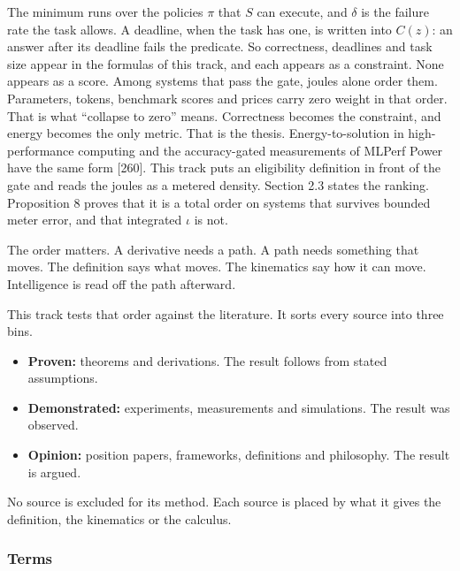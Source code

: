 \documentclass[
  10pt,
]{article}
\providecommand{\tightlist}{%
  \setlength{\itemsep}{0pt}\setlength{\parskip}{0pt}}
\begin{document}
The minimum runs over the policies \(\pi\) that \(S\) can execute, and
\(\delta\) is the failure rate the task allows. A deadline, when the
task has one, is written into \(C(z)\): an answer after its deadline
fails the predicate. So correctness, deadlines and task size appear in
the formulas of this track, and each appears as a constraint. None
appears as a score. Among systems that pass the gate, joules alone order
them. Parameters, tokens, benchmark scores and prices carry zero weight
in that order. That is what ``collapse to zero'' means. Correctness
becomes the constraint, and energy becomes the only metric. That is the
thesis. Energy-to-solution in high-performance computing and the
accuracy-gated measurements of MLPerf Power have the same form
{[}260{]}. This track puts an eligibility definition in front of the
gate and reads the joules as a metered density. Section 2.3 states the
ranking. Proposition 8 proves that it is a total order on systems that
survives bounded meter error, and that integrated \(\iota\) is not.

The order matters. A derivative needs a path. A path needs something
that moves. The definition says what moves. The kinematics say how it
can move. Intelligence is read off the path afterward.

This track tests that order against the literature. It sorts every
source into three bins.

\begin{itemize}
\tightlist
\item
  \textbf{Proven:} theorems and derivations. The result follows from
  stated assumptions.
\item
  \textbf{Demonstrated:} experiments, measurements and simulations. The
  result was observed.
\item
  \textbf{Opinion:} position papers, frameworks, definitions and
  philosophy. The result is argued.
\end{itemize}

No source is excluded for its method. Each source is placed by what it
gives the definition, the kinematics or the calculus.

\subsubsection{Terms}\label{terms}
\end{document}
